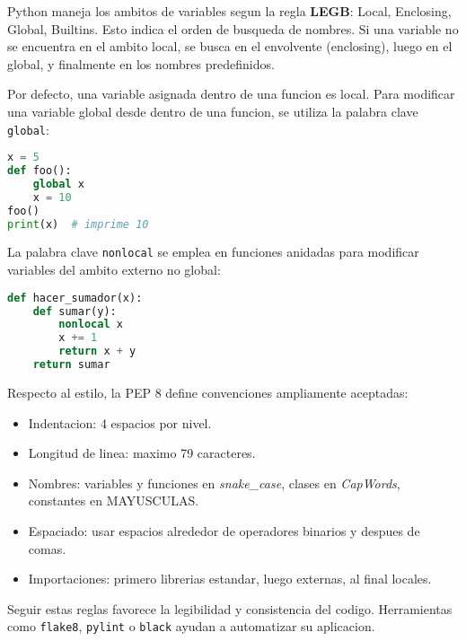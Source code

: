 Python maneja los ambitos de variables segun la regla \textbf{LEGB}: Local, Enclosing, Global, Builtins. Esto indica el orden de busqueda de nombres. Si una variable no se encuentra en el ambito local, se busca en el envolvente (enclosing), luego en el global, y finalmente en los nombres predefinidos.

Por defecto, una variable asignada dentro de una funcion es local. Para modificar una variable global desde dentro de una funcion, se utiliza la palabra clave \texttt{global}:

\begin{lstlisting}[language=Python, caption={Uso de global}]
x = 5
def foo():
    global x
    x = 10
foo()
print(x)  # imprime 10
\end{lstlisting}

La palabra clave \texttt{nonlocal} se emplea en funciones anidadas para modificar variables del ambito externo no global:

\begin{lstlisting}[language=Python, caption={Uso de nonlocal}]
def hacer_sumador(x):
    def sumar(y):
        nonlocal x
        x += 1
        return x + y
    return sumar
\end{lstlisting}

Respecto al estilo, la PEP 8 define convenciones ampliamente aceptadas:

\begin{itemize}
    \item Indentacion: 4 espacios por nivel.
    \item Longitud de linea: maximo 79 caracteres.
    \item Nombres: variables y funciones en \textit{snake\_case}, clases en \textit{CapWords}, constantes en MAYUSCULAS.
    \item Espaciado: usar espacios alrededor de operadores binarios y despues de comas.
    \item Importaciones: primero librerias estandar, luego externas, al final locales.
\end{itemize}

Seguir estas reglas favorece la legibilidad y consistencia del codigo. Herramientas como \texttt{flake8}, \texttt{pylint} o \texttt{black} ayudan a automatizar su aplicacion.




























